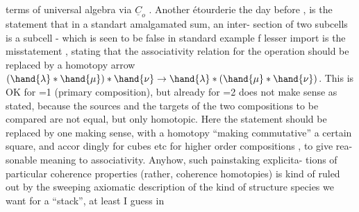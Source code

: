 terms of universal algebra via $\underline{C}_o$ . Another étourderie the day before\hand{,}
 , is the statement that in a standart amalgamated sum, an inter-%
section of two  subcells is a subcell - which is seen to be false in
  standard example \hand{\unsure{$\ell$}} f lesser import is the misstatement  ,
stating that the associativity relation for the operation \hand{$*_\ell$} should be
 replaced by a homotopy arrow
$(\hand{\lambda}*\hand{\mu})*\hand{\nu} \to \hand{\lambda}*(\hand{\mu}*\hand{\nu})$. This is OK for \hand{$\ell$}=1 (primary composition), but
already for \hand{$\ell$}=2 does not make sense as stated, because the sources and
the targets of the two compositions to be compared are not equal, but
only homotopic. Here the statement should be replaced by one making
sense, with a homotopy ``making commutative'' a certain square, and accor\hand{\unsure{-}}%
dingly for cubes etc for higher order compositions \hand{$\lambda *_\ell \mu$}, to give rea-%
sonable meaning to associativity. Anyhow, such painstaking explicita-%
tions of particular coherence properties (rather, coherence homotopies)
is kind of ruled out by the sweeping axiomatic description of the
kind of structure species we want for a ``stack'', at least\hand{,} I guess\hand{,} in
